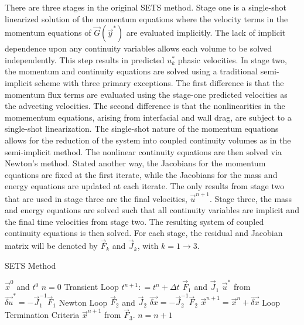 There are three stages in the original SETS method.
Stage one is a single-shot linearized solution of the momentum equations where the velocity terms in the momentum equations of $\vec{G}(\vec{y}^{*})$ are evaluated implicitly.
The lack of implicit dependence upon any continuity variables allows each volume to be solved independently.
This step results in predicted $u^{*}_{k}$ phasic velocities.
In stage two, the momentum and continuity equations are solved using a traditional semi-implicit scheme with three primary exceptions.
The first difference is that the momentum flux terms are evaluated using the stage-one predicted velocities as the advecting velocities.
The second difference is that the nonlinearities in the momementum equations, arising from interfacial and wall drag, are subject to a single-shot linearization.
The single-shot nature of the momentum equations allows for the reduction of the system into coupled continuity volumes as in the semi-implicit method.
The nonlinear continuity equations are then solved via Newton's method.
Stated another way, the Jacobians for the momentum equations are fixed at the first iterate, while the Jacobians for the mass and energy equations are updated at each iterate.
The only results from stage two that are used in stage three are the final velocities, $\vec{u}^{n+1}$.
Stage three, the mass and energy equations are solved such that all continuity variables are implicit and the final time velocities from stage two.
The resulting system of coupled continuity equations is then solved.
For each stage, the residual and Jacobian matrix will be denoted by $\vec{F}_k$ and $\vec{J}_k$, with $k = 1 \to 3$.

\begin{algo}[H]
\caption{SETS Method}
\label{alg:sets}
\setlength{\baselineskip}{0.625\baselineskip}
\begin{algorithmic}[1]
\Require $\vec{x}^{0}$ and $t^{0}$
\Set $n = 0$
\Loop \; Transient Loop
    \State $t^{n+1} : = t^{n} + \Delta t$
	\Calculate $\vec{F}_1$ and $\vec{J}_1$
	\Calculate $\vec{u}^{*}$ from $\vec{\delta u}^{*} = -\vec{J}^{-1}_1\vec{F}_1$
	\Loop \; Newton Loop
		\Calculate $\vec{F}_2$ and $\vec{J}_2$
		\BlackBox $\vec{\delta x} = - \vec{J}_2^{-1}\vec{F}_2$
		\Calculate $\vec{x}^{n+1} = \vec{x}^{n} + \vec{\delta x}$
		\BlackBox Loop Termination Criteria
	\EndLoop
	\Calculate $\vec{x}^{n+1}$ from $\vec{F}_3$.
	\State $n = n + 1$
\EndLoop
\end{algorithmic}
\end{algo}

